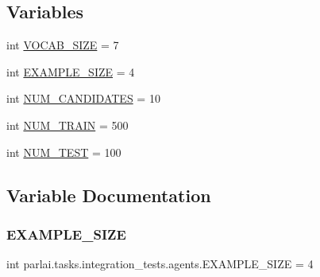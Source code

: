 \subsection*{Variables}
\begin{DoxyCompactItemize}
\item 
int \hyperlink{namespaceparlai_1_1tasks_1_1integration__tests_1_1agents_acce0481273f02014fb577733cfa8f2b7}{V\+O\+C\+A\+B\+\_\+\+S\+I\+ZE} = 7
\item 
int \hyperlink{namespaceparlai_1_1tasks_1_1integration__tests_1_1agents_a1a9a556c90b625c74c9afd0a1a82ca3c}{E\+X\+A\+M\+P\+L\+E\+\_\+\+S\+I\+ZE} = 4
\item 
int \hyperlink{namespaceparlai_1_1tasks_1_1integration__tests_1_1agents_a43719015a313515dcd768b12491ec3a1}{N\+U\+M\+\_\+\+C\+A\+N\+D\+I\+D\+A\+T\+ES} = 10
\item 
int \hyperlink{namespaceparlai_1_1tasks_1_1integration__tests_1_1agents_abc5a5ed634c3ec4aa371a49b883d37a1}{N\+U\+M\+\_\+\+T\+R\+A\+IN} = 500
\item 
int \hyperlink{namespaceparlai_1_1tasks_1_1integration__tests_1_1agents_ad6197fa4ad385bde5542da3aa644ad8b}{N\+U\+M\+\_\+\+T\+E\+ST} = 100
\end{DoxyCompactItemize}


\subsection{Variable Documentation}
\mbox{\label{namespaceparlai_1_1tasks_1_1integration__tests_1_1agents_a1a9a556c90b625c74c9afd0a1a82ca3c}} 
\subsubsection{\texorpdfstring{E\+X\+A\+M\+P\+L\+E\+\_\+\+S\+I\+ZE}{EXAMPLE\_SIZE}}
{\footnotesize\ttfamily int parlai.\+tasks.\+integration\+\_\+tests.\+agents.\+E\+X\+A\+M\+P\+L\+E\+\_\+\+S\+I\+ZE = 4}

\mbox{\label{namespaceparlai_1_1tasks_1_1integration__tests_1_1agents_a43719015a313515dcd768b12491ec3a1}} 
